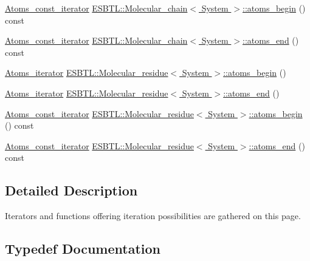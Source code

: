 \begin{DoxyCompactItemize}
\hyperlink{group__grp__iters_gad872d386b268126c9bb2a2127a6a7254}{Atoms\+\_\+const\+\_\+iterator} \hyperlink{group__grp__iters_gac6ba7621f15096a4633db8b112fd05fe}{E\+S\+B\+T\+L\+::\+Molecular\+\_\+chain$<$ System $>$\+::atoms\+\_\+begin} () const
\item 
\hyperlink{group__grp__iters_gad872d386b268126c9bb2a2127a6a7254}{Atoms\+\_\+const\+\_\+iterator} \hyperlink{group__grp__iters_ga925ea88c3cb1be749a9256b9ea77bc79}{E\+S\+B\+T\+L\+::\+Molecular\+\_\+chain$<$ System $>$\+::atoms\+\_\+end} () const
\item 
\hyperlink{group__grp__iters_ga4f220ea2d647f555b579a7ab2831baa7}{Atoms\+\_\+iterator} \hyperlink{group__grp__iters_ga1a03ace7902e971ae8a0d82eddf237c6}{E\+S\+B\+T\+L\+::\+Molecular\+\_\+residue$<$ System $>$\+::atoms\+\_\+begin} ()
\item 
\hyperlink{group__grp__iters_ga4f220ea2d647f555b579a7ab2831baa7}{Atoms\+\_\+iterator} \hyperlink{group__grp__iters_ga628b784affe52d58322c5f405b454def}{E\+S\+B\+T\+L\+::\+Molecular\+\_\+residue$<$ System $>$\+::atoms\+\_\+end} ()
\item 
\hyperlink{group__grp__iters_gab312d7a420670665b99a379b51825c9c}{Atoms\+\_\+const\+\_\+iterator} \hyperlink{group__grp__iters_ga1d1092e0acc1e4a6ee07b03a78af8e1c}{E\+S\+B\+T\+L\+::\+Molecular\+\_\+residue$<$ System $>$\+::atoms\+\_\+begin} () const
\item 
\hyperlink{group__grp__iters_gab312d7a420670665b99a379b51825c9c}{Atoms\+\_\+const\+\_\+iterator} \hyperlink{group__grp__iters_ga27d17ddd3a3c208e95464afb2e466459}{E\+S\+B\+T\+L\+::\+Molecular\+\_\+residue$<$ System $>$\+::atoms\+\_\+end} () const
\end{DoxyCompactItemize}


\subsection{Detailed Description}
Iterators and functions offering iteration possibilities are gathered on this page. 

\subsection{Typedef Documentation}
\mbox{\label{group__grp__iters_gabb95e73700fd84dbde6e089927e03a6d}} 
